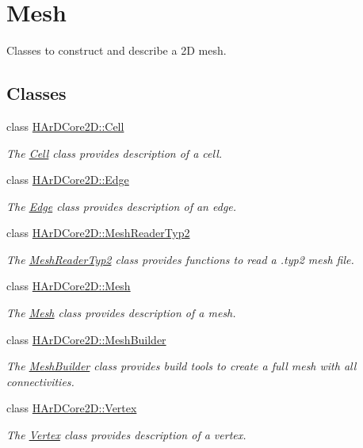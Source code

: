 \hypertarget{group__Mesh}{}\section{Mesh}
\label{group__Mesh}


Classes to construct and describe a 2D mesh.  


\subsection*{Classes}
\begin{DoxyCompactItemize}
\item 
class \hyperlink{classHArDCore2D_1_1Cell}{H\+Ar\+D\+Core2\+D\+::\+Cell}
\begin{DoxyCompactList}\small\item\em The \hyperlink{classHArDCore2D_1_1Cell}{Cell} class provides description of a cell. \end{DoxyCompactList}\item 
class \hyperlink{classHArDCore2D_1_1Edge}{H\+Ar\+D\+Core2\+D\+::\+Edge}
\begin{DoxyCompactList}\small\item\em The \hyperlink{classHArDCore2D_1_1Edge}{Edge} class provides description of an edge. \end{DoxyCompactList}\item 
class \hyperlink{classHArDCore2D_1_1MeshReaderTyp2}{H\+Ar\+D\+Core2\+D\+::\+Mesh\+Reader\+Typ2}
\begin{DoxyCompactList}\small\item\em The \hyperlink{classHArDCore2D_1_1MeshReaderTyp2}{Mesh\+Reader\+Typ2} class provides functions to read a .typ2 mesh file. \end{DoxyCompactList}\item 
class \hyperlink{classHArDCore2D_1_1Mesh}{H\+Ar\+D\+Core2\+D\+::\+Mesh}
\begin{DoxyCompactList}\small\item\em The \hyperlink{classHArDCore2D_1_1Mesh}{Mesh} class provides description of a mesh. \end{DoxyCompactList}\item 
class \hyperlink{classHArDCore2D_1_1MeshBuilder}{H\+Ar\+D\+Core2\+D\+::\+Mesh\+Builder}
\begin{DoxyCompactList}\small\item\em The \hyperlink{classHArDCore2D_1_1MeshBuilder}{Mesh\+Builder} class provides build tools to create a full mesh with all connectivities. \end{DoxyCompactList}\item 
class \hyperlink{classHArDCore2D_1_1Vertex}{H\+Ar\+D\+Core2\+D\+::\+Vertex}
\begin{DoxyCompactList}\small\item\em The \hyperlink{classHArDCore2D_1_1Vertex}{Vertex} class provides description of a vertex. \end{DoxyCompactList}\end{DoxyCompactItemize}
